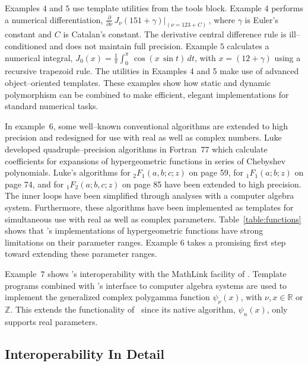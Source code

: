 Examples $4$ and $5$ use template utilities from the tools block.
Example $4$ performs a numerical differentiation,
$\frac{\partial}{\partial\nu}\,J_{\nu}(151+\gamma)\big|_{(\nu=123+C)}\,$,
where $\gamma$ is Euler's constant and $C$ is Catalan's constant.
The derivative central difference rule is ill--conditioned
and does not maintain full precision.
Example $5$ calculates a numerical integral,
$J_{0}(x)=\frac{1}{\pi}\int_{0}^{\pi}\,\cos(x\,\sin t)\,dt$, with $x=\left(12+\gamma\right)$
using a recursive trapezoid rule.
The utilities in Examples 4 and 5 make use of advanced
object--oriented templates. These examples show how static and dynamic
polymorphism can be combined to make efficient, elegant implementations
for standard numerical tasks.

In example~$6$, some well--known conventional algorithms are extended
to high precision and redesigned for use with real as well as complex
numbers. Luke~\cite{lukealgo:textbook} developed quadruple--precision
algorithms in For\-tran~$77$ which calculate coefficients for expansions
of hy\-per\-ge\-o\-me\-tric functions in series of Cheb\-y\-shev polynomials.
Luke's algorithms
{} for $_{2}F_{1}(a, b; c; z)$ on page 59,
{} for $_{1}F_{1}(a; b; z)$ on page 74,
and
{} for $_{1}F_{2}(a; b, c; z)$ on page 85
have been extended to high precision. The inner loops have been
simplified through analyses with a computer algebra system.
Furthermore, these algorithms have been implemented as templates
for simultaneous use with real as well as complex pa\-ra\-me\-ters.
Table~\ref{table:functions} shows that \efloat's implementations
of hy\-per\-ge\-o\-me\-tric functions have strong limitations on their
parameter ranges. Example $6$ takes a promising first step toward
extending these parameter ranges.

Example~$7$ shows \efloat's interoperability with
the Math\-Link{\footnotesize {\textregistered}} facility of \mathematica.
Template programs combined with \efloat's
interface to computer algebra systems are used to
implement the generalized complex poly\-gam\-ma function
$\psi_{\nu}(x)$, with $\nu$,$\,x\in\mathbb{R}$ or $\mathbb{Z}$.
This extends the functionality of \efloat\ since its native al\-go\-rithm,
$\psi_{n}(x)$, only supports real parameters.

\subsection{Interoperability In Detail}

